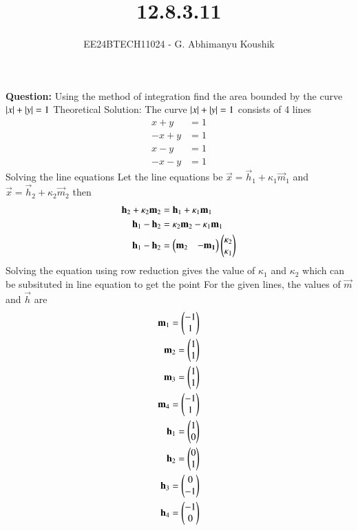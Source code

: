 \documentclass[journal]{IEEEtran}
\begin{document}

\vspace{3cm}

\title{12.8.3.11}
\author{EE24BTECH11024 - G. Abhimanyu Koushik}
{\let\newpage\relax\maketitle}
\textbf{Question:}
Using the method of integration find the area bounded by the curve $\left\vert x\right\vert + \left\vert y\right\vert = 1$
\solution\newline
Theoretical Solution:\newline
The curve $\left\vert x\right\vert + \left\vert y\right\vert = 1$ consists of 4 lines
\begin{align}
	x+y&=1\\
	-x+y&=1\\
	x-y&=1\\
	-x-y&=1
\end{align}
Solving the line equations\newline
Let the line equations be $\vec{x} = \vec{h}_1 + \kappa_1\vec{m}_1$ and $\vec{x} = \vec{h}_2 + \kappa_2\vec{m}_2$ then
\begin{align}
	\mathbf{h}_2 + \kappa_2\mathbf{m}_2 &= \mathbf{h}_1 + \kappa_1\mathbf{m}_1\\
	\mathbf{h}_1 - \mathbf{h}_2 &=  \kappa_2\mathbf{m}_2 - \kappa_1\mathbf{m}_1\\
	\mathbf{h}_1 - \mathbf{h}_2 &= \begin{pmatrix}\mathbf{m}_2 & -\mathbf{m_1}\end{pmatrix}\begin{pmatrix}\kappa_2\\\kappa_1\end{pmatrix}
\end{align}
Solving the equation using row reduction gives the value of $\kappa_1$ and $\kappa_2$ which can be subsituted in line equation to get the point\newline
For the given lines, the values of $\vec{m}$ and $\vec{h}$ are
\begin{align}
	\mathbf{m}_1 = \begin{pmatrix}-1\\1\end{pmatrix}\\
	\mathbf{m}_2 = \begin{pmatrix}1\\1\end{pmatrix}\\
	\mathbf{m}_3 = \begin{pmatrix}1\\1\end{pmatrix}\\
	\mathbf{m}_4 = \begin{pmatrix}-1\\1\end{pmatrix}\\
	\mathbf{h}_1 = \begin{pmatrix}1\\0\end{pmatrix}\\
	\mathbf{h}_2 = \begin{pmatrix}0\\1\end{pmatrix}\\
	\mathbf{h}_3 = \begin{pmatrix}0\\-1\end{pmatrix}\\
	\mathbf{h}_4 = \begin{pmatrix}-1\\0\end{pmatrix}
\end{align}
\end{document}
